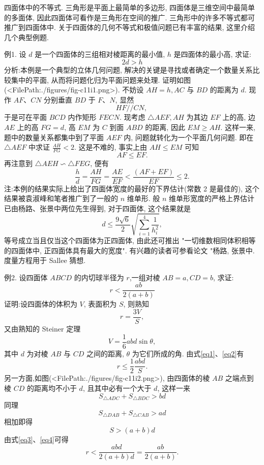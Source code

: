 
四面体中的不等式.
三角形是平面上最简单的多边形, 四面体是三维空间中最简单的多面体, 因此四面体可看作是三角形在空间的推广.
三角形中的许多不等式都可推广到四面体中.
关于四面体的几何不等式和极值问题已有丰富的结果, 这里介绍几个典型例题.



例1. 设 $d$ 是一个四面体的三组相对棱距离的最小值, $h$ 是四面体的最小高, 求证:
$$
2 d>h
$$
分析:本例是一个典型的立体几何问题, 解决的关键是寻找或者确定一个数量关系比较集中的平面, 从而将问题化归为平面问题来处理.
证明如图(<FilePath:./figures/fig-c11i1.png>). 不妨设 $A H=h, A C$ 与 $B D$ 的距离为 $d$. 现作 $A F 、 C N$ 分别垂直 $B D$ 于 $F 、 N$, 显然
$$
H F / / C N \text {, }
$$
于是可在平面 $B C D$ 内作矩形 $F E C N$.
现考虑 $\triangle A E F, A H$ 为其边 $E F$ 上的高, 边 $A E$ 上的高 $F G=d$, 高 $E M$ 为 $C$ 到面 $A B D$ 的距离, 因此 $E M \geqslant A H$.
这样一来, 题中的数量关系都集中到了平面 $A E F$ 内, 问题就转化为一个平面几何问题.
即在 $\triangle A E F$ 中求证 $\frac{A H}{F G}<2$.
这是不难的, 事实上由 $A H \leqslant E M$ 可知
$$
A F \leqslant E F .
$$
再注意到 $\triangle A E H \backsim \triangle F E G$, 便有
$$
\frac{h}{d}=\frac{A H}{F G}=\frac{A E}{E F}<\frac{(A F+E F)}{E F} \leqslant 2 .
$$
注:本例的结果实际上给出了四面体宽度的最好的下界估计(常数 2 是最佳的), 这个结果被袁淑峰和笔者推广到了一般的 $n$ 维单形.
般 $n$ 维单形宽度的严格上界估计已由杨路、张景中两位先生得到, 对于四面体, 这个结果就是
$$
d \leqslant \frac{9 \sqrt{6}}{2} \sqrt{\sum_{i=1}^4 \frac{1}{h_i^2}},
$$
等号成立当且仅当这个四面体为正四面体, 由此还可推出 "一切维数相同体积相等的四面体中, 正四面体具有最大的宽度". 有兴趣的读者可参看论文 "杨路, 张景中.
度量方程用于 Sallee 猜想.



例2. 设四面体 $A B C D$ 的内切球半径为 $r$,一组对棱 $A B=a, C D=b$, 求证:
$$
r<\frac{a b}{2(a+b)}
$$
证明:设四面体的体积为 $V$, 表面积为 $S$, 则熟知
$$
r=\frac{3 V}{S}, \label{eq1}
$$
又由熟知的 Steiner 定理
$$
V=\frac{1}{6} a b d \sin \theta, \label{eq2}
$$
其中 $d$ 为对棱 $A B$ 与 $C D$ 之间的距离, $\theta$ 为它们所成的角.
由式\ref{eq1}、\ref{eq2}有
$$
r \leqslant \frac{1}{2} \frac{a b d}{S} . \label{eq3}
$$
另一方面,如图(<FilePath:./figures/fig-c11i2.png>), 由四面体的棱 $A B$ 之端点到棱 $C D$ 的距离均不小于 $d$, 且其中必有一个大于 $d$, 这样一来
$$
S_{\triangle A D C}+S_{\triangle B D C}>b d
$$
同理
$$
S_{\triangle D A B}+S_{\triangle C A B}>a d
$$
相加即得
$$
S>(a+b) d
$$
由式\ref{eq3}、\ref{eq4}可得
$$
r<\frac{a b d}{2(a+b) d}=\frac{a b}{2(a+b)} .
$$



